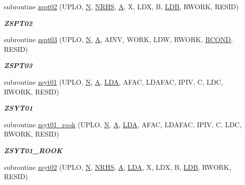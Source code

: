\begin{DoxyCompactItemize}
subroutine \hyperlink{group__complex16__lin_ga9cd3ee261a20155136e8a21947d4a3ae}{zspt02} (U\+P\+L\+O, \hyperlink{polmisc_8c_a0240ac851181b84ac374872dc5434ee4}{N}, \hyperlink{example__user_8c_aa0138da002ce2a90360df2f521eb3198}{N\+R\+H\+S}, \hyperlink{classA}{A}, X, L\+D\+X, B, \hyperlink{example__user_8c_a50e90a7104df172b5a89a06c47fcca04}{L\+D\+B}, R\+W\+O\+R\+K, R\+E\+S\+I\+D)
\begin{DoxyCompactList}\small\item\em {\bfseries Z\+S\+P\+T02} \end{DoxyCompactList}\item 
subroutine \hyperlink{group__complex16__lin_ga3d55441f4aa7be616d35cea3f4a95ac7}{zspt03} (U\+P\+L\+O, \hyperlink{polmisc_8c_a0240ac851181b84ac374872dc5434ee4}{N}, \hyperlink{classA}{A}, A\+I\+N\+V, W\+O\+R\+K, L\+D\+W, R\+W\+O\+R\+K, \hyperlink{superlu__enum__consts_8h_af00a42ecad444bbda75cde1b64bd7e72a9b5c151728d8512307565994c89919d5}{R\+C\+O\+N\+D}, R\+E\+S\+I\+D)
\begin{DoxyCompactList}\small\item\em {\bfseries Z\+S\+P\+T03} \end{DoxyCompactList}\item 
subroutine \hyperlink{group__complex16__lin_ga71d0addf5b4285e14f0e6c24b832f42b}{zsyt01} (U\+P\+L\+O, \hyperlink{polmisc_8c_a0240ac851181b84ac374872dc5434ee4}{N}, \hyperlink{classA}{A}, \hyperlink{example__user_8c_ae946da542ce0db94dced19b2ecefd1aa}{L\+D\+A}, A\+F\+A\+C, L\+D\+A\+F\+A\+C, I\+P\+I\+V, C, L\+D\+C, R\+W\+O\+R\+K, R\+E\+S\+I\+D)
\begin{DoxyCompactList}\small\item\em {\bfseries Z\+S\+Y\+T01} \end{DoxyCompactList}\item 
subroutine \hyperlink{group__complex16__lin_gad11ed366debcca51d51db084210f74c3}{zsyt01\+\_\+rook} (U\+P\+L\+O, \hyperlink{polmisc_8c_a0240ac851181b84ac374872dc5434ee4}{N}, \hyperlink{classA}{A}, \hyperlink{example__user_8c_ae946da542ce0db94dced19b2ecefd1aa}{L\+D\+A}, A\+F\+A\+C, L\+D\+A\+F\+A\+C, I\+P\+I\+V, C, L\+D\+C, R\+W\+O\+R\+K, R\+E\+S\+I\+D)
\begin{DoxyCompactList}\small\item\em {\bfseries Z\+S\+Y\+T01\+\_\+\+R\+O\+O\+K} \end{DoxyCompactList}\item 
subroutine \hyperlink{group__complex16__lin_ga1a83d0f19354b6504e079719a8b3c5e0}{zsyt02} (U\+P\+L\+O, \hyperlink{polmisc_8c_a0240ac851181b84ac374872dc5434ee4}{N}, \hyperlink{example__user_8c_aa0138da002ce2a90360df2f521eb3198}{N\+R\+H\+S}, \hyperlink{classA}{A}, \hyperlink{example__user_8c_ae946da542ce0db94dced19b2ecefd1aa}{L\+D\+A}, X, L\+D\+X, B, \hyperlink{example__user_8c_a50e90a7104df172b5a89a06c47fcca04}{L\+D\+B}, R\+W\+O\+R\+K, R\+E\+S\+I\+D)

\end{DoxyCompactItemize}
